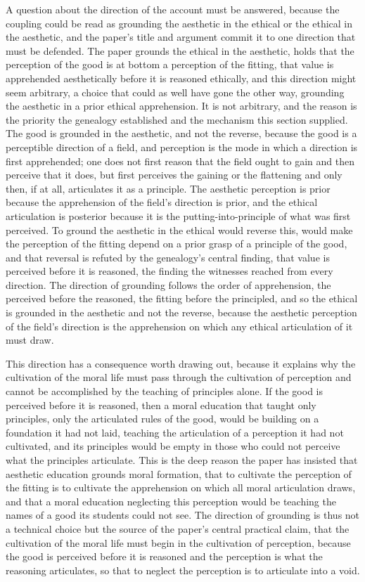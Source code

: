 A question about the direction of the account must be answered, because the coupling could be read as grounding the aesthetic in the ethical or the ethical in the aesthetic, and the paper's title and argument commit it to one direction that must be defended. The paper grounds the ethical in the aesthetic, holds that the perception of the good is at bottom a perception of the fitting, that value is apprehended aesthetically before it is reasoned ethically, and this direction might seem arbitrary, a choice that could as well have gone the other way, grounding the aesthetic in a prior ethical apprehension. It is not arbitrary, and the reason is the priority the genealogy established and the mechanism this section supplied. The good is grounded in the aesthetic, and not the reverse, because the good is a perceptible direction of a field, and perception is the mode in which a direction is first apprehended; one does not first reason that the field ought to gain and then perceive that it does, but first perceives the gaining or the flattening and only then, if at all, articulates it as a principle. The aesthetic perception is prior because the apprehension of the field's direction is prior, and the ethical articulation is posterior because it is the putting-into-principle of what was first perceived. To ground the aesthetic in the ethical would reverse this, would make the perception of the fitting depend on a prior grasp of a principle of the good, and that reversal is refuted by the genealogy's central finding, that value is perceived before it is reasoned, the finding the witnesses reached from every direction. The direction of grounding follows the order of apprehension, the perceived before the reasoned, the fitting before the principled, and so the ethical is grounded in the aesthetic and not the reverse, because the aesthetic perception of the field's direction is the apprehension on which any ethical articulation of it must draw.

This direction has a consequence worth drawing out, because it explains why the cultivation of the moral life must pass through the cultivation of perception and cannot be accomplished by the teaching of principles alone. If the good is perceived before it is reasoned, then a moral education that taught only principles, only the articulated rules of the good, would be building on a foundation it had not laid, teaching the articulation of a perception it had not cultivated, and its principles would be empty in those who could not perceive what the principles articulate. This is the deep reason the paper has insisted that aesthetic education grounds moral formation, that to cultivate the perception of the fitting is to cultivate the apprehension on which all moral articulation draws, and that a moral education neglecting this perception would be teaching the names of a good its students could not see. The direction of grounding is thus not a technical choice but the source of the paper's central practical claim, that the cultivation of the moral life must begin in the cultivation of perception, because the good is perceived before it is reasoned and the perception is what the reasoning articulates, so that to neglect the perception is to articulate into a void.

